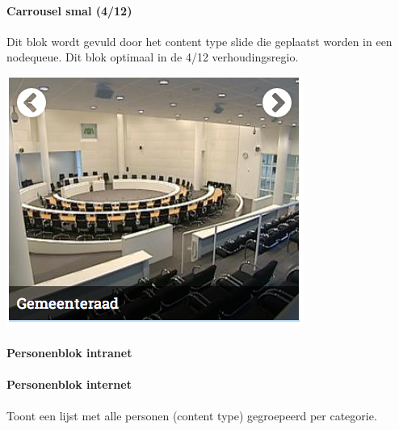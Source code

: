 \paragraph{Carrousel smal (4/12)}

Dit blok wordt gevuld door het content type slide die geplaatst worden in een nodequeue. Dit blok optimaal in de 4/12 verhoudingsregio.

\begin{center}
	\includegraphics[scale=0.5]{img/blokken/carrouselsmal.png}
\end{center}

\paragraph{Personenblok intranet}

\paragraph{Personenblok internet}\label{personenblokinternet}

Toont een lijst met alle personen (content type) gegroepeerd per categorie.

